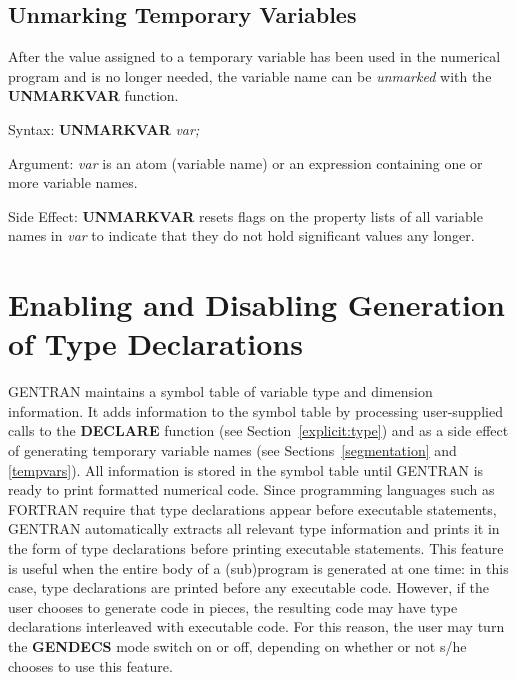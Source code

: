 \subsection{Unmarking Temporary Variables}
After the value assigned to a temporary variable has been used
in the numerical program and is no longer needed, the variable name can be 
{\it unmarked} with the {\bf UNMARKVAR} function.
\begin{describe}{Syntax:}
{\bf UNMARKVAR} {\it  var;}
\end{describe}
\begin{describe}{Argument:}
{\it var} is an atom (variable name) or an expression containing one or more
variable names.
\end{describe}
\begin{describe}{Side Effect:}
{\bf UNMARKVAR} resets flags on the property lists of all variable names in 
{\it var} to indicate that they do not hold significant values any longer.
\end{describe}
\section{Enabling and Disabling Generation of Type Declarations}
\label{control:type}
GENTRAN maintains a symbol table of variable type and dimension
information.  It adds information to the symbol table by processing
user-supplied calls to the {\bf DECLARE} function (see
Section~\ref{explicit:type}) and as a
side effect of generating temporary variable names 
(see Sections~\ref{segmentation} and \ref{tempvars}).
All information is stored in the symbol table until GENTRAN is ready
to print formatted numerical code.  Since programming languages such as
FORTRAN require that type declarations appear before executable statements,
GENTRAN automatically extracts all relevant type information and prints it
in the form of type declarations before printing executable
statements.  This feature is useful when the entire body of a (sub)program is
generated at one time:  in this case, type declarations are printed
before any executable code.  However, if the user chooses to generate code
in pieces, the resulting code may have type declarations interleaved
with executable code.  For this reason, the user may turn the {\bf GENDECS}
mode switch on or off, depending on whether or not s/he chooses to use
this feature.

